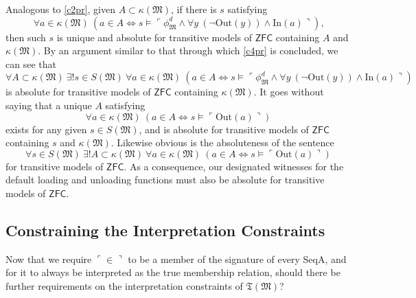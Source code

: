\documentclass[12pt, twoside]{memoir}
\numberwithin{equation}{section}
\theoremstyle{definition}
\theoremstyle{remark}
\theoremstyle{definition}
\theoremstyle{definition}
\theoremstyle{definition}
\theoremstyle{remark}
\begin{document}
Analogous to \ref{c2pr}, given $A \subset \kappa(\mathfrak{M})$, if there is $s$ satisfying
\begin{equation*}
    \forall a \in \kappa(\mathfrak{M}) \ (a \in A \iff s \models \ulcorner \phi^d_{\mathfrak{M}} \wedge \forall y \ (\neg \mathrm{Out}(y)) \wedge \mathrm{In}(a) \urcorner) \text{,}
\end{equation*}
then such $s$ is unique and absolute for transitive models of $\mathsf{ZFC}$ containing $A$ and $\kappa(\mathfrak{M})$. By an argument similar to that through which \ref{c4pr} is concluded, we can see that 
\begin{equation*}
    \forall A \subset \kappa(\mathfrak{M}) \ \exists ! s \in S(\mathfrak{M}) \ \forall a \in \kappa(\mathfrak{M}) \ (a \in A \iff s \models \ulcorner \phi^d_{\mathfrak{M}} \wedge \forall y \ (\neg \mathrm{Out}(y)) \wedge \mathrm{In}(a) \urcorner)
\end{equation*}
is absolute for transitive models of $\mathsf{ZFC}$ containing $\kappa(\mathfrak{M})$. It goes without saying that a unique $A$ satisfying
\begin{equation*}
    \forall a \in \kappa(\mathfrak{M}) \ (a \in A \iff s \models \ulcorner \mathrm{Out}(a) \urcorner)
\end{equation*}
exists for any given $s \in S(\mathfrak{M})$, and is absolute for transitive models of $\mathsf{ZFC}$ containing $s$ and $\kappa(\mathfrak{M})$. Likewise obvious is the absoluteness of the sentence
\begin{equation*}
    \forall s \in S(\mathfrak{M}) \ \exists ! A \subset \kappa(\mathfrak{M}) \ \forall a \in \kappa(\mathfrak{M}) \ (a \in A \iff s \models \ulcorner \mathrm{Out}(a) \urcorner)
\end{equation*}
for transitive models of $\mathsf{ZFC}$. As a consequence, our designated witnesses for the default loading and unloading functions must also be absolute for transitive models of $\mathsf{ZFC}$.

\subsection{Constraining the Interpretation Constraints} 

Now that we require $\ulcorner \in \urcorner$ to be a member of the signature of every SeqA, and for it to always be interpreted as the true membership relation, should there be further requirements on the interpretation constraints of $\mathfrak{T}(\mathfrak{M})$?
\end{document}
